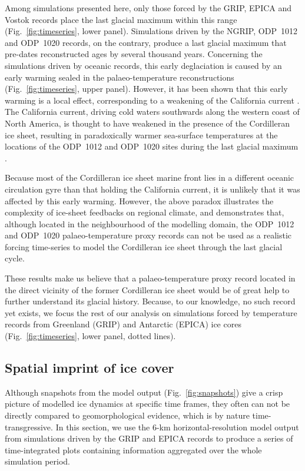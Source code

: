 \documentclass[tc, manuscript]{copernicus}
\begin{document}
Among simulations presented here, only those forced by the GRIP, EPICA and
Vostok records place the last glacial maximum within this range
(Fig.~\ref{fig:timeseries}, lower panel). Simulations driven by the NGRIP,
ODP~1012 and ODP~1020 records, on the contrary, produce a last glacial maximum
that pre-dates reconstructed ages by several thousand years. Concerning the
simulations driven by oceanic records, this early deglaciation is caused by an
early warming sealed in the palaeo-temperature reconstructions
(Fig.~\ref{fig:timeseries}, upper panel). However, it has been shown that this
early warming is a local effect, corresponding to a weakening of the California
current \citep[Fig.~3]{Herbert.etal.2001}. The California current, driving cold
waters southwards
along the western coast of North America, is thought to have weakened in the
presence of the Cordilleran ice sheet, resulting in paradoxically warmer
sea-surface temperatures at the locations of the ODP~1012 and ODP~1020 sites
during the last glacial maximum \citep{Herbert.etal.2001}.

Because most of the Cordilleran ice sheet marine front lies in a different
oceanic circulation gyre than that holding the California current, it is
unlikely that it was affected by this early warming. However, the above paradox
illustrates the complexity of ice-sheet feedbacks on regional climate, and
demonstrates that, although located in the neighbourhood of the modelling
domain, the ODP~1012 and ODP~1020 palaeo-temperature proxy records can not be
used as a realistic forcing time-series to model the Cordilleran ice sheet
through the last glacial cycle.

These results make us believe that a palaeo-temperature proxy record located
in the direct vicinity of the former Cordilleran ice sheet would be of great
help to further understand its glacial history. Because, to our knowledge, no
such record yet exists, we focus the rest of our analysis on simulations forced
by temperature records from Greenland (GRIP) and Antarctic (EPICA) ice cores
(Fig.~\ref{fig:timeseries}, lower panel, dotted lines).

\subsection{Spatial imprint of ice cover}

Although snapshots from the model output (Fig.~\ref{fig:snapshots}) give a
crisp picture of modelled ice dynamics at specific time frames, they often
can not be directly compared to geomorphological evidence, which is by nature
time-transgressive. In this section, we use the 6-km horizontal-resolution
model output from simulations driven by the GRIP and EPICA records to produce
a series of time-integrated plots containing information aggregated over the
whole simulation period.
\end{document}
